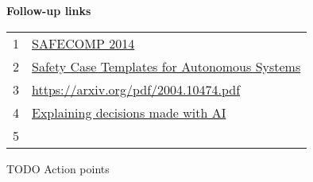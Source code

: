 \textbf{Follow-up links}
\vspace{0.23cm}

\begin{tabular}{ll}
1 & \href{https://bit.ly/3AOiM43}{SAFECOMP 2014} \\
2 & \href{https://arxiv.org/abs/2102.02625}{Safety Case Templates for Autonomous Systems} \\
3 & \href{Assurance 2.0: A Manifesto}{https://arxiv.org/pdf/2004.10474.pdf} \\
4 & \href{https://ico.org.uk/for-organisations/guide-to-data-protection/key-data-protection-themes/explaining-decisions-made-with-artificial-intelligence/}{Explaining decisions made with AI} \\
5 & 





\end{tabular}

TODO Action points
